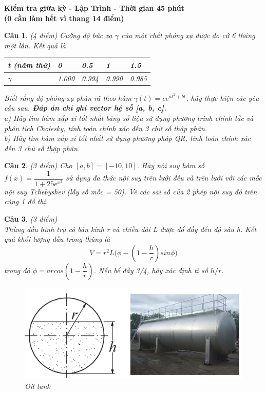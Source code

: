 \documentclass[11pt]{article}
\newtheorem{bt}{Câu}
\begin{document}



\begin{center}
	{\bf Kiểm tra giữa kỳ - Lập Trình - Thời gian 45 phút \\ (0 cần làm hết vì thang 14 điểm)}
\end{center}

\begin{bt}(4 điểm) Cường độ bức xạ $\gamma$ của một chất phóng xạ được đo cứ 6 tháng một lần. Kết quả là
	\begin{center}
		\begin{tabular}[7]{|l|l|l|l|l|} \hline
			t (năm thứ) &  0 & 0.5 & 1 & 1.5 \\ \hline
			$\gamma$ &  1.000 & 0.994 & 0.990 & 0.985  \\ \hline
		\end{tabular}	
	\end{center}
	Biết rằng độ phóng xạ phân rã theo hàm $\gamma(t) = c e^{a t^2 + bt}$, hãy thực hiện các yêu cầu sau. \textbf{Đáp án chỉ ghi vector hệ số [a, b, c].} \\
	a) Hãy tìm hàm xấp xỉ tốt nhất bảng số liệu sử dụng phương trình chính tắc và phân tích Cholesky, tính toán chính xác đến 3 chữ số thập phân. \\
	b) Hãy tìm hàm xấp xỉ tốt nhất sử dụng phương pháp QR, tính toán chính xác đến 3 chữ số thập phân. 
\end{bt}

\begin{bt}(3 điểm)
	Cho $[a,b] = [-10,10]$. Hãy nội suy hàm số $f(x) = \dfrac{1}{1 + 25 e^{x^2}}$ sử dụng đa thức nội suy trên lưới đều và trên lưới với các mốc nội suy Tchebyshev (lấy số mốc = 50). Vẽ các sai số của 2 phép nội suy đó trên cùng 1 đồ thị. 
\end{bt}

\begin{bt}(3 điểm) \\ %
	Thùng dầu hình trụ có bán kính r và chiều dài L được đổ đầy đến độ sâu h. Kết quả
	khối lượng dầu trong thùng là
	\[
	V = r^2L \Big( \phi - \left(1 - \dfrac{h}{r}\right) sin \phi \Big)
	\]
	trong đó $\phi = arcos\left(1 - \dfrac{h}{r}\right)$. Nếu bể đầy 3/4, hãy xác định tỉ số $h/r$.
	
	\begin{figure}[h!]
		\centering
		\includegraphics[width=0.7\linewidth]{Figures/oil_tank}
		\caption{Oil tank}
		\label{fig:oiltank}
	\end{figure}
\end{bt}
\end{document}
